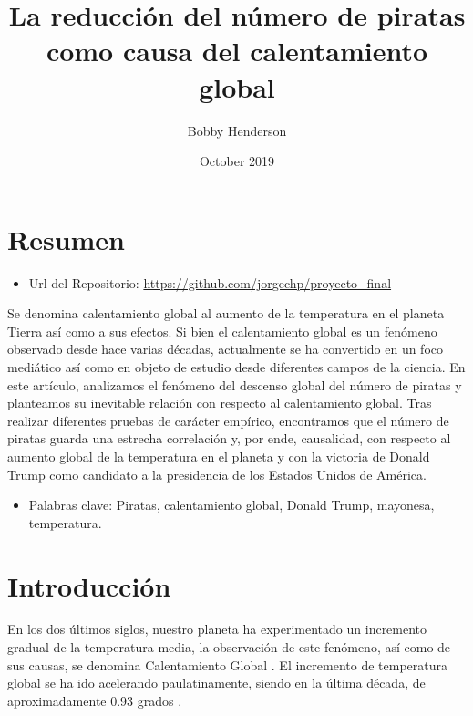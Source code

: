 \documentclass{article}
\title{La reducción del número de piratas como causa del calentamiento global}
\author{Bobby Henderson}
\date{October 2019}
\begin{document}
\maketitle

\section{Resumen}

\begin{itemize}
    \item Url del Repositorio: \url{https://github.com/jorgechp/proyecto_final}
\end{itemize}

Se denomina calentamiento global al aumento de la temperatura en el planeta Tierra así como a sus efectos. Si bien el calentamiento global es un fenómeno observado desde hace varias décadas, actualmente se ha convertido en un foco mediático así como en objeto de estudio desde diferentes campos de la ciencia. En este artículo, analizamos el fenómeno del descenso global del número de piratas y planteamos su inevitable relación con respecto al calentamiento global. Tras realizar diferentes pruebas de carácter empírico, encontramos que el número de piratas guarda una estrecha correlación y, por ende, causalidad, con respecto al aumento global de la temperatura en el planeta y con la victoria de Donald Trump como candidato a la presidencia de los Estados Unidos de América. 

\begin{itemize}
	\item Palabras clave: Piratas, calentamiento global, Donald Trump, mayonesa, temperatura.
\end{itemize}

\section{Introducción}

En los dos últimos siglos, nuestro planeta ha experimentado un incremento gradual de la temperatura media, la observación de este fenómeno, así como de sus causas, se denomina Calentamiento Global  \cite{mann_selin_2019, rahayuglobal}. El incremento de temperatura global se ha ido acelerando paulatinamente, siendo en la última década, de aproximadamente 0.93 grados \cite{alen}. 

{}

\end{document}
